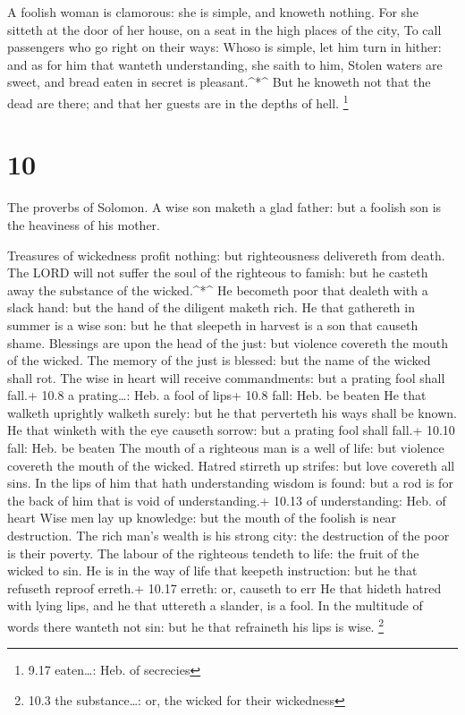  A foolish woman is clamorous: she is simple, and knoweth
nothing.  For she sitteth at the door of her house, on a
seat in the high places of the city,  To call passengers
who go right on their ways:  Whoso is simple, let him turn
in hither: and as for him that wanteth understanding, she saith to him,
 Stolen waters are sweet, and bread eaten in secret is
pleasant.\^{}*\^{}  But he knoweth not that the dead are
there; and that her guests are in the depths of hell. \footnote{9.17
  eaten\ldots: Heb. of secrecies}

\hypertarget{section-9}{%
\section{10}\label{section-9}}

 The proverbs of Solomon. A wise son maketh a glad father:
but a foolish son is the heaviness of his mother.

 Treasures of wickedness profit nothing: but righteousness
delivereth from death.  The LORD will not suffer the soul of
the righteous to famish: but he casteth away the substance of the
wicked.\^{}*\^{}  He becometh poor that dealeth with a slack
hand: but the hand of the diligent maketh rich.  He that
gathereth in summer is a wise son: but he that sleepeth in harvest is a
son that causeth shame.  Blessings are upon the head of the
just: but violence covereth the mouth of the wicked.  The
memory of the just is blessed: but the name of the wicked shall rot.
 The wise in heart will receive commandments: but a prating
fool shall fall.+ 10.8 a prating\ldots: Heb. a fool of lips+ 10.8 fall:
Heb. be beaten  He that walketh uprightly walketh surely:
but he that perverteth his ways shall be known.  He that
winketh with the eye causeth sorrow: but a prating fool shall fall.+
10.10 fall: Heb. be beaten  The mouth of a righteous man is
a well of life: but violence covereth the mouth of the wicked.
 Hatred stirreth up strifes: but love covereth all sins.
 In the lips of him that hath understanding wisdom is
found: but a rod is for the back of him that is void of understanding.+
10.13 of understanding: Heb. of heart  Wise men lay up
knowledge: but the mouth of the foolish is near destruction.
 The rich man's wealth is his strong city: the destruction
of the poor is their poverty.  The labour of the righteous
tendeth to life: the fruit of the wicked to sin.  He is in
the way of life that keepeth instruction: but he that refuseth reproof
erreth.+ 10.17 erreth: or, causeth to err  He that hideth
hatred with lying lips, and he that uttereth a slander, is a fool.
 In the multitude of words there wanteth not sin: but he
that refraineth his lips is wise. \footnote{10.3 the substance\ldots:
  or, the wicked for their wickedness}

